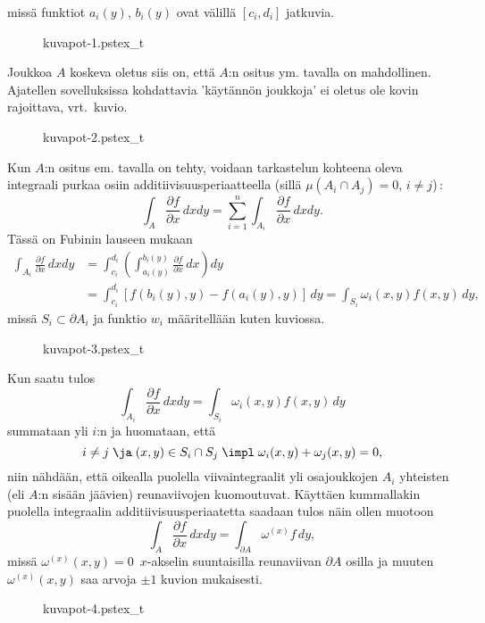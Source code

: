 missä funktiot $a_i(y)$, $b_i(y)$ ovat välillä $[c_i,d_i]$  jatkuvia.
\begin{figure}[H]
\begin{center}
{kuvapot-1.pstex_t}
\end{center}
\end{figure}
Joukkoa $A$ koskeva oletus siis on, että $A$:n ositus ym. tavalla on mahdollinen. Ajatellen 
sovelluksissa kohdattavia 'käytännön joukkoja' ei oletus ole kovin rajoittava, vrt.\ kuvio.
\begin{figure}[H]
\begin{center}
{kuvapot-2.pstex_t}
\end{center}
\end{figure}
Kun $A$:n ositus em. tavalla on tehty, voidaan tarkastelun kohteena oleva integraali purkaa
osiin additiivisuusperiaatteella (sillä $\mu(A_i\cap A_j)=0$, $i\neq j$)\,:
\[
\int_A \frac{\partial f}{\partial x}\,dxdy
           =\sum_{i=1}^n \int_{A_i}\frac{\partial f}{\partial x}\,dxdy.
\]
Tässä on Fubinin lauseen mukaan
\begin{align*}
\int_{A_i} \frac{\partial f}{\partial x}\,dxdy 
&= \int_{c_i}^{d_i}\left(\int_{a_i(y)}^{b_i(y)}\frac{\partial f}{\partial x}\,dx\right)dy \\
&=\int_{c_i}^{d_i} [f(b_i(y),y)-f(a_i(y),y)]\,dy = \int_{S_i} \omega_i(x,y)f(x,y)\,dy,
\end{align*}
missä $S_i\subset \partial A_i$ ja funktio $w_i$ määritellään kuten kuviossa.
\begin{figure}[H]
\begin{center}
{kuvapot-3.pstex_t}
\end{center}
\end{figure}
Kun saatu tulos
\[
\int_{A_i} \frac{\partial f}{\partial x}\,dxdy=\int_{S_i}\omega_i(x,y)f(x,y)\,dy
\]
summataan yli $i$:n ja huomataan, että
\[
i\neq j \; \ja \; (x,y)\in S_i\cap S_j \; \impl \; \omega_i(x,y)+\omega_j(x,y)=0,
\]
niin nähdään, että oikealla puolella viivaintegraalit yli osajoukkojen $A_i$ yhteisten 
(eli $A$:n sisään jäävien) reunaviivojen kuomoutuvat. Käyttäen kummallakin puolella integraalin 
additiivisuusperiaatetta saadaan tulos näin ollen muotoon
\[
\int_A \frac{\partial f}{\partial x}\,dxdy=\int_{\partial A} \omega^{(x)}f\,dy,
\]
missä $\omega^{(x)}(x,y)=0\,$ $x$-akselin suuntaisilla reunaviivan $\partial A$ osilla ja muuten
$\omega^{(x)}(x,y)$ saa arvoja $\pm 1$ kuvion mukaisesti.
\begin{figure}[H]
\begin{center}
{kuvapot-4.pstex_t}
\end{center}
\end{figure}
